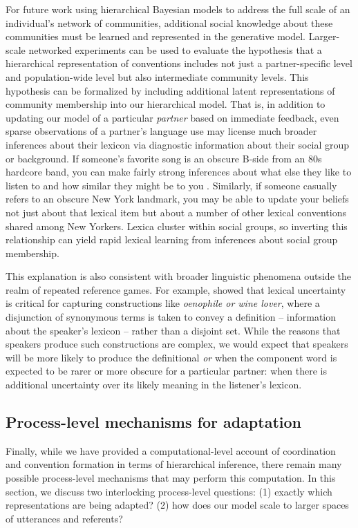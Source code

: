For future work using hierarchical Bayesian models to address the full scale of an individual's  network of communities, additional social knowledge about these communities must be learned and represented in the generative model.
Larger-scale networked experiments can be used to evaluate the hypothesis that a hierarchical representation of conventions includes not just a partner-specific level and population-wide level but also intermediate community levels. 
This hypothesis can be formalized by including additional latent representations of community membership into our hierarchical model.
That is, in addition to updating our model of a particular \emph{partner} based on immediate feedback, even sparse observations of a partner's language use may license much broader inferences about their lexicon via diagnostic information about their social group or background. 
If someone's favorite song is an obscure B-side from an 80s hardcore band, you can make fairly strong inferences about what else they like to listen to and how similar they might be to you \cite{VelezEtAl16_Overlaps, GershmanEtAl17_StructureSocialInfluence}. 
Similarly, if someone casually refers to an obscure New York landmark, you may be able to update your beliefs not just about that lexical item but about a number of other lexical conventions shared among New Yorkers. 
Lexica cluster within social groups, so inverting this relationship can yield rapid lexical learning from inferences about social group membership.

This explanation is also consistent with broader linguistic phenomena outside the realm of repeated reference games. 
For example,  showed that lexical uncertainty is critical for capturing constructions like \emph{oenophile or wine lover}, where a disjunction of synonymous terms is taken to convey a definition -- information about the speaker's lexicon -- rather than a disjoint set. 
While the reasons that speakers produce such constructions are complex, we would expect that speakers will be more likely to produce the definitional \emph{or} when the component word is expected to be rarer or more obscure for a particular partner: when there is additional uncertainty over its likely meaning in the listener's lexicon.


\subsection{Process-level mechanisms for adaptation}

Finally, while we have provided a computational-level account of coordination and convention formation in terms of hierarchical inference, there remain many possible process-level mechanisms that may perform this computation.
In this section, we discuss two interlocking process-level questions: (1) exactly which representations are being adapted? (2) how does our model scale to larger spaces of utterances and referents? %

